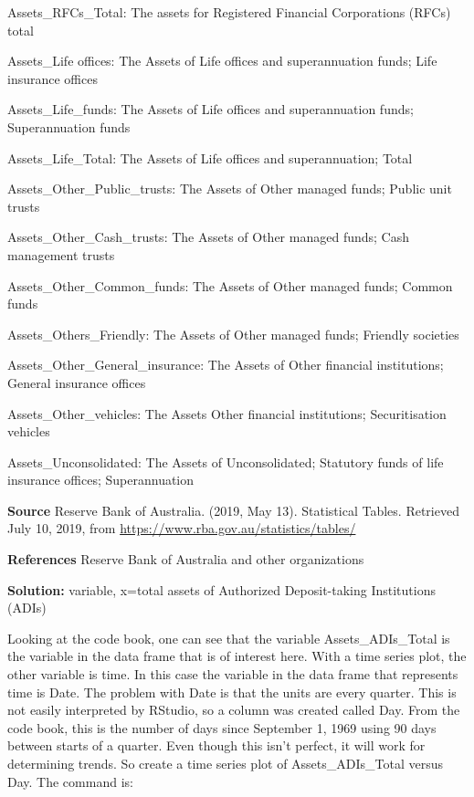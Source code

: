 \documentclass[
]{book}
\begin{document}
Assets\_RFCs\_Total: The assets for Registered Financial Corporations (RFCs) total

Assets\_Life offices: The Assets of Life offices and superannuation funds; Life insurance offices

Assets\_Life\_funds: The Assets of Life offices and superannuation funds; Superannuation funds

Assets\_Life\_Total: The Assets of Life offices and superannuation; Total

Assets\_Other\_Public\_trusts: The Assets of Other managed funds; Public unit trusts

Assets\_Other\_Cash\_trusts: The Assets of Other managed funds; Cash management trusts

Assets\_Other\_Common\_funds: The Assets of Other managed funds; Common funds

Assets\_Others\_Friendly: The Assets of Other managed funds; Friendly societies

Assets\_Other\_General\_insurance: The Assets of Other financial institutions; General insurance offices

Assets\_Other\_vehicles: The Assets Other financial institutions; Securitisation vehicles

Assets\_Unconsolidated: The Assets of Unconsolidated; Statutory funds of life insurance offices; Superannuation

\textbf{Source}
Reserve Bank of Australia. (2019, May 13). Statistical Tables. Retrieved July 10, 2019, from \url{https://www.rba.gov.au/statistics/tables/}

\textbf{References}
Reserve Bank of Australia and other organizations

\textbf{Solution:}
variable, x=total assets of Authorized Deposit-taking Institutions (ADIs)

Looking at the code book, one can see that the variable Assets\_ADIs\_Total is the variable in the data frame that is of interest here. With a time series plot, the other variable is time. In this case the variable in the data frame that represents time is Date. The problem with Date is that the units are every quarter. This is not easily interpreted by RStudio, so a column was created called Day. From the code book, this is the number of days since September 1, 1969 using 90 days between starts of a quarter. Even though this isn't perfect, it will work for determining trends. So create a time series plot of Assets\_ADIs\_Total versus Day. The command is:
\end{document}
